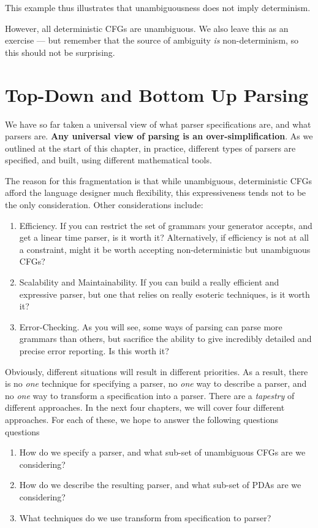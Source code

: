 This example thus illustrates that unambiguousness does not imply determinism.

However, all deterministic CFGs are unambiguous. We also leave this as an exercise --- but remember that the source of ambiguity \textit{is} non-determinism, so this should not be surprising.

\section{Top-Down and Bottom Up Parsing}
We have so far taken a universal view of what parser specifications are, and what parsers are. \textbf{Any universal view of parsing is an over-simplification}. As we outlined at the start of this chapter, in practice, different types of parsers are specified, and built, using different mathematical tools.

The reason for this fragmentation is that while unambiguous, deterministic CFGs afford the language designer much flexibility, this expressiveness  tends not to be the only consideration. Other considerations include:

\begin{enumerate}
    \item Efficiency. If you can restrict the set of grammars your generator accepts, and get a linear time parser, is it worth it? Alternatively, if efficiency is not at all a constraint, might it be worth accepting non-deterministic but unambiguous CFGs?
    \item Scalability and Maintainability. If you can build a really efficient and expressive parser, but one that relies on really esoteric techniques, is it worth it?
    \item Error-Checking. As you will see, some ways of parsing can parse more grammars than others, but sacrifice the ability to give incredibly detailed and precise error reporting. Is this worth it?
\end{enumerate}

Obviously, different situations will result in different priorities. As a result, there is no \textit{one} technique for specifying a parser, no \textit{one} way to describe a parser, and no \textit{one} way to transform a specification into a parser. There are a \textit{tapestry} of different approaches. In the next four chapters, we will cover four different approaches. For each of these, we hope to answer the following questions questions

\begin{enumerate}
    \item How do we specify a parser, and what sub-set of unambiguous CFGs are we considering?
    \item How do we describe the resulting parser, and what sub-set of PDAs are we considering?
    \item What techniques do we use transform from specification to parser?
\end{enumerate}

